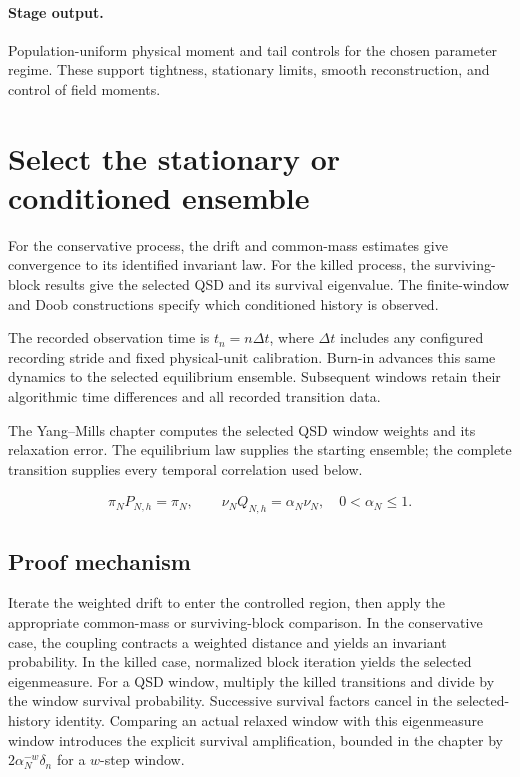 \documentclass[11pt,a4paper]{article}
\begin{document}
\paragraph{Stage output.} Population-uniform physical moment and tail controls for the chosen parameter regime. These support tightness, stationary limits, smooth reconstruction, and control of field moments.

\section{Select the stationary or conditioned ensemble}
\label{stage:4}
For the conservative process, the drift and common-mass estimates give convergence to its identified invariant law. For the killed process, the surviving-block results give the selected QSD and its survival eigenvalue. The finite-window and Doob constructions specify which conditioned history is observed.

The recorded observation time is \(t_n=n\Delta t\), where \(\Delta t\) includes any configured recording stride and fixed physical-unit calibration. Burn-in advances this same dynamics to the selected equilibrium ensemble. Subsequent windows retain their algorithmic time differences and all recorded transition data.

The Yang--Mills chapter computes the selected QSD window weights and its relaxation error. The equilibrium law supplies the starting ensemble; the complete transition supplies every temporal correlation used below.

\begin{gather*}
\pi_NP_{N,h}=\pi_N,\qquad \nu_NQ_{N,h}=\alpha_N\nu_N,\quad 0<\alpha_N\le1.
\end{gather*}
\subsection*{Proof mechanism}
Iterate the weighted drift to enter the controlled region, then apply the appropriate common-mass or surviving-block comparison. In the conservative case, the coupling contracts a weighted distance and yields an invariant probability. In the killed case, normalized block iteration yields the selected eigenmeasure. For a QSD window, multiply the killed transitions and divide by the window survival probability. Successive survival factors cancel in the selected-history identity. Comparing an actual relaxed window with this eigenmeasure window introduces the explicit survival amplification, bounded in the chapter by \(2\alpha_N^{-w}\delta_n\) for a \(w\)-step window.
\end{document}
